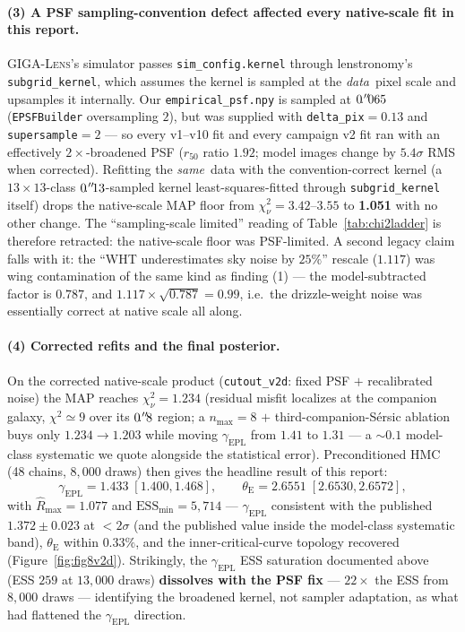 \documentclass[11pt,letterpaper]{article}
\newcommand{\thetaE}{\ensuremath{\theta_{\mathrm{E}}}}
\newcommand{\gammaEPL}{\ensuremath{\gamma_{\mathrm{EPL}}}}
\newcommand{\gigalens}{\textsc{GIGA-Lens}}
\begin{document}
\paragraph{(3) A PSF sampling-convention defect affected every
native-scale fit in this report.} \gigalens's simulator passes
\texttt{sim\_config.kernel} through lenstronomy's
\texttt{subgrid\_kernel}, which assumes the kernel is sampled at the
{\it data}\ pixel scale and upsamples it internally. Our
\texttt{empirical\_psf.npy} is sampled at $0\mbox{$\!\!\,.{}^{\prime\prime}\!\!\,$}065$
(\texttt{EPSFBuilder} oversampling $2$), but was supplied with
\texttt{delta\_pix}$=0.13$ and \texttt{supersample}$=2$ --- so every
v1--v10 fit and every campaign v2 fit ran with an effectively
$2\times$-broadened PSF ($r_{50}$ ratio $1.92$; model images change by
$5.4\sigma$ RMS when corrected). Refitting the {\it same}\ data with
the convention-correct kernel (a $13\times13$-class $0\mbox{$\!\!\,.{}^{\prime\prime}\!\!\,$}13$-sampled
kernel least-squares-fitted through \texttt{subgrid\_kernel} itself)
drops the native-scale MAP floor from $\chi^{2}_{\nu}=3.42$--$3.55$ to
{\bf 1.051} with no other change. The ``sampling-scale limited''
reading of Table~\ref{tab:chi2ladder} is therefore retracted: the
native-scale floor was PSF-limited. A second legacy claim falls with
it: the ``WHT underestimates sky noise by $25\%$'' rescale
($1.117$) was wing contamination of the same kind as finding (1) ---
the model-subtracted factor is $0.787$, and
$1.117\times\sqrt{0.787}=0.99$, i.e.\ the drizzle-weight noise was
essentially correct at native scale all along.

\paragraph{(4) Corrected refits and the final posterior.} On the
corrected native-scale product (\texttt{cutout\_v2d}: fixed PSF $+$
recalibrated noise) the MAP reaches $\chi^{2}_{\nu}=1.234$ (residual
misfit localizes at the companion galaxy, $\chi^{2}\simeq9$ over its
$0\mbox{$\!\!\,.{}^{\prime\prime}\!\!\,$}8$ region; a $n_{\max}=8$ $+$ third-companion-S\'{e}rsic
ablation buys only $1.234\to1.203$ while moving $\gammaEPL$ from
$1.41$ to $1.31$ --- a $\sim$$0.1$ model-class systematic we quote
alongside the statistical error). Preconditioned HMC (48 chains,
$8{,}000$ draws) then gives the headline result of this report:
\[
\gammaEPL = 1.433\;[1.400, 1.468],\qquad
\thetaE = 2.6551\;[2.6530, 2.6572],
\]
with $\hat R_{\max}=1.077$ and $\mathrm{ESS}_{\min}=5{,}714$ ---
$\gammaEPL$ consistent with the published $1.372\pm0.023$ at
$<2\sigma$ (and the published value inside the model-class systematic
band), $\thetaE$ within $0.33\%$, and the inner-critical-curve
topology recovered (Figure~\ref{fig:fig8v2d}). Strikingly, the
$\gammaEPL$ ESS saturation documented above (ESS $259$ at $13{,}000$
draws) {\bf dissolves with the PSF fix} --- $22\times$ the ESS from
$8{,}000$ draws --- identifying the broadened kernel, not sampler
adaptation, as what had flattened the $\gammaEPL$ direction.
\end{document}
